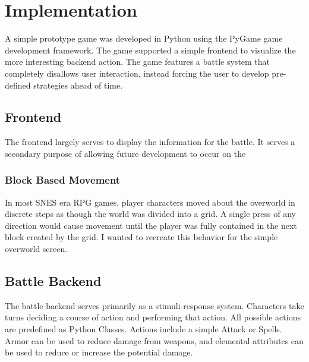 \documentclass[11pt]{article}
\begin{document}

\section{Implementation}

A simple prototype game was developed in Python using the PyGame game development framework.  The game supported a simple frontend to visualize the more interesting backend action. The game features a battle system that completely disallows user interaction, instead forcing the user to develop pre-defined strategies ahead of time.

\subsection{Frontend}

The frontend largely serves to display the information for the battle.  It serves a secondary purpose of allowing future development to occur on the 

\subsubsection{Block Based Movement}

In most SNES era RPG games, player characters moved about the overworld in discrete steps as though the world was divided into a grid.  A single press of any direction would cause movement until the player was fully contained in the next block created by the grid.  I wanted to recreate this behavior for the simple overworld screen.

\subsection{Battle Backend}

The battle backend serves primarily as a stimuli-response system.  Characters take turns deciding a course of action and performing that action.  All possible actions are predefined as Python Classes.  Actions include a simple Attack or Spells.  Armor can be used to reduce damage from weapons, and elemental attributes can be used to reduce or increase the potential damage.  
\end{document}
